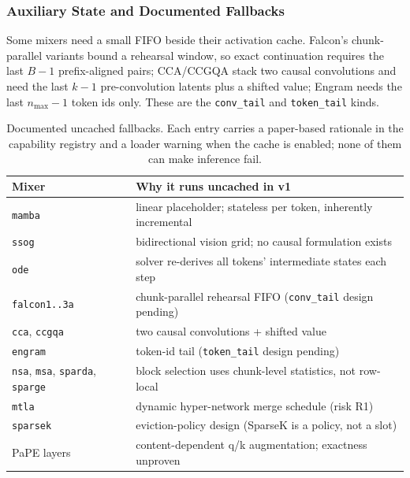 \subsubsection{Auxiliary State and Documented Fallbacks}
\label{sec:kv-fallbacks}

Some mixers need a small FIFO beside their activation cache. Falcon's chunk-parallel variants bound a rehearsal window, so exact continuation requires the last $B-1$ prefix-aligned pairs; CCA/CCGQA stack two causal convolutions and need the last $k-1$ pre-convolution latents plus a shifted value; Engram needs the last $n_{\max}-1$ token ids only. These are the \texttt{conv\_tail} and \texttt{token\_tail} kinds.

\begin{table}[H]
\centering
\small
\begin{tabularx}{0.98\linewidth}{l X}
\toprule
\textbf{Mixer} & \textbf{Why it runs uncached in v1} \\
\midrule
\texttt{mamba} & linear placeholder; stateless per token, inherently incremental \\
\texttt{ssog} & bidirectional vision grid; no causal formulation exists \\
\texttt{ode} & solver re-derives all tokens' intermediate states each step \\
\texttt{falcon1..3a} & chunk-parallel rehearsal FIFO (\texttt{conv\_tail} design pending) \\
\texttt{cca}, \texttt{ccgqa} & two causal convolutions + shifted value \\
\texttt{engram} & token-id tail (\texttt{token\_tail} design pending) \\
\texttt{nsa}, \texttt{msa}, \texttt{sparda}, \texttt{sparge} & block selection uses chunk-level statistics, not row-local \\
\texttt{mtla} & dynamic hyper-network merge schedule (risk R1) \\
\texttt{sparsek} & eviction-policy design (SparseK is a policy, not a slot) \\
PaPE layers & content-dependent q/k augmentation; exactness unproven \\
\bottomrule
\end{tabularx}
\caption{Documented uncached fallbacks. Each entry carries a paper-based rationale in the capability registry and a loader warning when the cache is enabled; none of them can make inference fail.}
\label{tab:kv-fallbacks}
\end{table}

